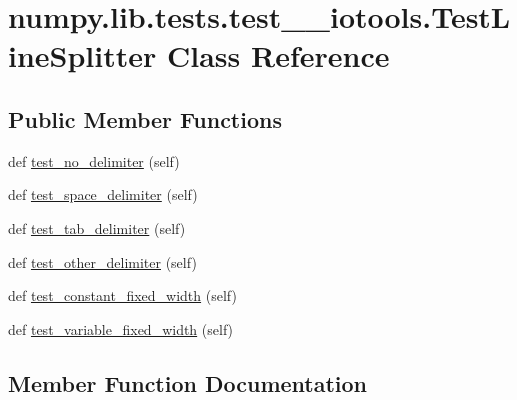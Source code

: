 \hypertarget{classnumpy_1_1lib_1_1tests_1_1test____iotools_1_1TestLineSplitter}{}\section{numpy.\+lib.\+tests.\+test\+\_\+\+\_\+iotools.\+Test\+Line\+Splitter Class Reference}
\label{classnumpy_1_1lib_1_1tests_1_1test____iotools_1_1TestLineSplitter}
\subsection*{Public Member Functions}
\begin{DoxyCompactItemize}
\item 
def \hyperlink{classnumpy_1_1lib_1_1tests_1_1test____iotools_1_1TestLineSplitter_a5ac5ecddf1bf5f70ab8082b0da684647}{test\+\_\+no\+\_\+delimiter} (self)
\item 
def \hyperlink{classnumpy_1_1lib_1_1tests_1_1test____iotools_1_1TestLineSplitter_a18a9d2791e3b9eff9f6980da8e3c49aa}{test\+\_\+space\+\_\+delimiter} (self)
\item 
def \hyperlink{classnumpy_1_1lib_1_1tests_1_1test____iotools_1_1TestLineSplitter_a0882c0c68832d3f08fa760f3a1e0bc94}{test\+\_\+tab\+\_\+delimiter} (self)
\item 
def \hyperlink{classnumpy_1_1lib_1_1tests_1_1test____iotools_1_1TestLineSplitter_a058b3f9d66b7a5ea126a20c5f7b362e9}{test\+\_\+other\+\_\+delimiter} (self)
\item 
def \hyperlink{classnumpy_1_1lib_1_1tests_1_1test____iotools_1_1TestLineSplitter_adbe794a063f421beb4a4ea8b24e712ed}{test\+\_\+constant\+\_\+fixed\+\_\+width} (self)
\item 
def \hyperlink{classnumpy_1_1lib_1_1tests_1_1test____iotools_1_1TestLineSplitter_a5e9fbaf875e8eaa530ac4681668d0c52}{test\+\_\+variable\+\_\+fixed\+\_\+width} (self)
\end{DoxyCompactItemize}


\subsection{Member Function Documentation}
\mbox{\label{classnumpy_1_1lib_1_1tests_1_1test____iotools_1_1TestLineSplitter_adbe794a063f421beb4a4ea8b24e712ed}} 
